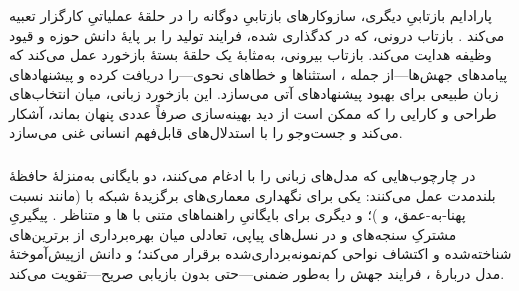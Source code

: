 \subsubsection{\protect{}}

پارادایم بازتابیِ دیگری، سازوکارهای بازتابیِ دوگانه را در حلقهٔ عملیاتیِ کارگزار تعبیه می‌کند \cite{ji2025RZNAS}. بازتاب درونی، که در  کدگذاری شده، فرایند تولید را بر پایهٔ دانش حوزه و قیود وظیفه هدایت می‌کند. بازتاب بیرونی، به‌مثابهٔ یک حلقهٔ بستهٔ بازخورد عمل می‌کند که پیامدهای جهش‌ها—از جمله ، استثناها و خطاهای نحوی—را دریافت کرده و پیشنهادهای زبان طبیعی برای بهبود پیشنهادهای آتی می‌سازد. این بازخورد زبانی،  میان انتخاب‌های طراحی و کارایی را که ممکن است از دید بهینه‌سازی صرفاً عددی پنهان بماند، آشکار می‌کند و جست‌وجو را با استدلال‌های قابل‌فهم انسانی غنی می‌سازد.

\subsubsection{\protect{}}

در چارچوب‌هایی که مدل‌های زبانی را با  ادغام می‌کنند، دو بایگانی به‌منزلهٔ حافظهٔ بلندمدت عمل می‌کنند: یکی برای نگهداری معماری‌های برگزیدهٔ شبکه با  (مانند نسبت پهنا-به-عمق، و )؛ و دیگری برای بایگانیِ راهنماهای متنی با ها و  متناظر \cite{LLMatic2024}. پیگیریِ مشترکِ سنجه‌های  و  در نسل‌های پیاپی، تعادلی میان بهره‌برداری از برترین‌های شناخته‌شده و اکتشاف نواحی کم‌نمونه‌برداری‌شده برقرار می‌کند؛ و دانش ازپیش‌آموختهٔ مدل دربارهٔ ، فرایند جهش را به‌طور ضمنی—حتی بدون بازیابی صریح—تقویت می‌کند.

\subsection[راهبردهای تقویتِ آمیخته]{\protect{}}

